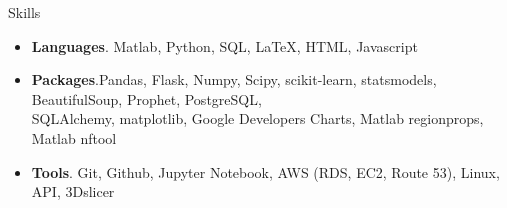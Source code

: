 \documentclass{resume} %
\begin{document}
	\begin{rSection}{Skills}
		\begin{itemize}[leftmargin=0em]
			\item {\bf Languages}{. Matlab, Python, SQL, LaTeX, HTML, Javascript}
			\item {\bf Packages}{.Pandas, Flask, Numpy, Scipy, scikit-learn, statsmodels, BeautifulSoup, Prophet, PostgreSQL, \\SQLAlchemy, matplotlib, Google Developers Charts, Matlab regionprops, Matlab nftool}
			\item {\bf Tools}{. Git, Github, Jupyter Notebook, AWS (RDS, EC2, Route 53), Linux, API, 3Dslicer}
			
		\end{itemize}
	\end{rSection}
	
\end{document}
